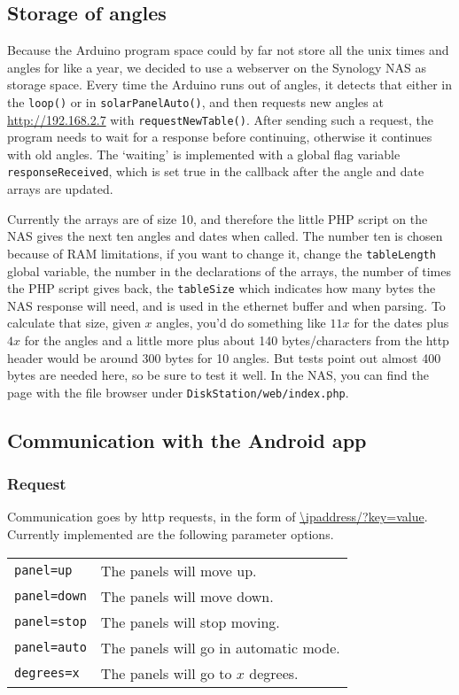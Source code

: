 \subsection{Storage of angles}\label{subsec:storageOfAngles}
    Because the Arduino program space could by far not store all the unix times and angles for like a year, we decided to use a webserver on the Synology NAS as storage space.
    Every time the Arduino runs out of angles, it detects that either in the \verb|loop()| or in \verb|solarPanelAuto()|, and then requests new angles at \url{http://192.168.2.7} with \verb|requestNewTable()|. After sending such a request, the program needs to wait for a response before continuing, otherwise it continues with old angles.
    The `waiting' is implemented with a global flag variable \verb|responseReceived|, which is set true in the callback after the angle and date arrays are updated.

    Currently the arrays are of size 10, and therefore the little PHP script on the NAS gives the next ten angles and dates when called.
    The number ten is chosen because of RAM limitations, if you want to change it, change the \verb|tableLength| global variable, the number in the declarations of the arrays, the number of times the PHP script gives back, the \verb|tableSize| which indicates how many bytes the NAS response will need, and is used in the ethernet buffer and when parsing.
    To calculate that size, given $x$ angles, you'd do something like $11x$ for the dates plus $4x$ for the angles and a little more plus about 140 bytes/characters from the http header would be around 300 bytes for 10 angles.
    But tests point out almost 400 bytes are needed here, so be sure to test it well.
    In the NAS, you can find the page with the file browser under \verb|DiskStation/web/index.php|.

\subsection{Communication with the Android app} \label{subsec:arduinotoandroid}
    \subsubsection{Request}
    Communication goes by http requests, in the form of \url{\ipaddress/?key=value}.
    Currently implemented are the following parameter options.

    \begin{tabular}{ll}
        \verb|panel=up| & The panels will move up. \\
        \verb|panel=down| & The panels will move down. \\
        \verb|panel=stop| & The panels will stop moving. \\
        \verb|panel=auto| & The panels will go in automatic mode. \\
        \verb|degrees=x| & The panels will go to $x$ degrees. \\
    \end{tabular}

